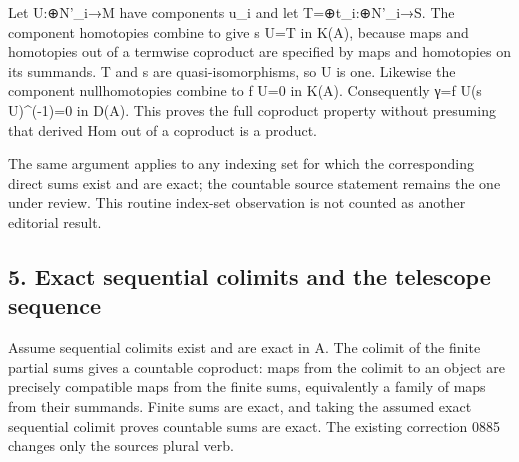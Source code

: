 \documentclass[11pt]{article}
\begin{document}
Let U:\allowbreak{}\allowbreak{}⊕N'\_\allowbreak{}i\allowbreak{}→M have components u\_\allowbreak{}i and let T\allowbreak{}=\allowbreak{}⊕t\_\allowbreak{}i:\allowbreak{}\allowbreak{}⊕N'\_\allowbreak{}i\allowbreak{}→S. The component homotopies combine to give s U\allowbreak{}=T in K(A)\allowbreak{},\allowbreak{} because maps and homotopies out of a termwise coproduct are specified by maps and homotopies on its summands. T and s are quasi-isomorphisms,\allowbreak{} so U is one. Likewise the component nullhomotopies combine to f U\allowbreak{}=0 in K(A)\allowbreak{}. Consequently γ\allowbreak{}=f U(s U)\allowbreak{}\textasciicircum{}(-1)\allowbreak{}\allowbreak{}=0 in D(A)\allowbreak{}. This proves the full coproduct property without presuming that derived Hom out of a coproduct is a product.

The same argument applies to any indexing set for which the corresponding direct sums exist and are exact; the countable source statement remains the one under review. This routine index-set observation is not counted as another editorial result.

\subsection{5. Exact sequential colimits and the telescope sequence}\label{proofs-10139-10427-exact-sequential-colimits-and-the-telescope-sequence}

Assume sequential colimits exist and are exact in A. The colimit of the finite partial sums gives a countable coproduct:\allowbreak{} maps from the colimit to an object are precisely compatible maps from the finite sums,\allowbreak{} equivalently a family of maps from their summands. Finite sums are exact,\allowbreak{} and taking the assumed exact sequential colimit proves countable sums are exact. The existing correction 0885 changes only the source\textquotesingle s plural verb.
\end{document}
